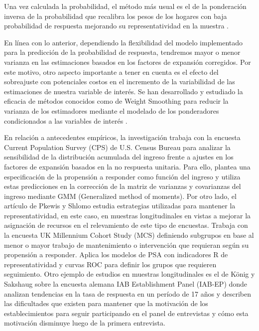 \documentclass{article}
\begin{document}
Una vez calculada la probabilidad, el método más usual es el de la ponderación inversa de la probabilidad que recalibra los pesos de los hogares con baja probabilidad de respuesta mejorando su representatividad en la muestra \cite{methodsml}. 

En línea con lo anterior, dependiendo la flexibilidad del modelo implementado para la predicción de la probabilidad de respuesta, tendremos mayor o menor varianza en las estimaciones basados en los factores de expansión corregidos. Por este motivo, otro aspecto importante a tener en cuenta es el efecto del sobreajuste con potenciales costos en el incremento de la variabilidad de las estimaciones de nuestra variable de interés. Se han desarrollado y estudiado la eficacia de métodos conocidos como de Weight Smoothing para reducir la varianza de los estimadores mediante el modelado de los ponderadores condicionados a las variables de interés \cite{wsmooth}.

En relación a antecedentes empíricos, la investigación \cite{korinek07} trabaja con la encuesta Current Population Survey (CPS) de U.S. Census Bureau para analizar la sensibilidad de la distribución acumulada del ingreso frente a ajustes en los factores de expansión basados en la no respuesta unitaria. Para ello, plantea una especificación de la propensión a responder como función del ingreso y utiliza estas predicciones en la corrección de la matriz de varianzas y covarianzas del ingreso mediante GMM (Generalized method of moments). Por otro lado, el artículo de Pkewis y Shlomo \cite{longitudinal-non-response} estudia estrategias utilizadas para mantener la representatividad, en este caso, en muestras longitudinales en vistas a mejorar la asignación de recursos en el relevamiento de este tipo de encuestas. Trabaja con la encuesta UK Millennium Cohort Study (MCS) definiendo subgrupos en base al menor o mayor trabajo de mantenimiento o intervención que requieran según su propensión a responder. Aplica los modelos de PSA con indicadores R de representatividad y curvas ROC para definir los grupos que requieren seguimiento. Otro ejemplo de estudios en muestras longitudinales es el de König y Sakshaug \cite{longitudinal-empresas} sobre la encuesta alemana IAB Establishment Panel (IAB-EP) donde analizan tendencias en la tasa de respuesta en un período de 17 años y describen las dificultades que existen para mantener que la motivación de los establecimientos para seguir participando en el panel de entrevistas y cómo esta motivación disminuye luego de la primera entrevista.  
\end{document}
